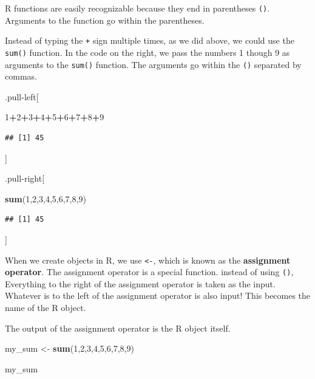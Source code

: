 \documentclass[
]{book}
\newenvironment{Shaded}{\begin{snugshade}}{\end{snugshade}}
\newcommand{\DecValTok}[1]{\textcolor[rgb]{0.00,0.00,0.81}{#1}}
\newcommand{\FunctionTok}[1]{\textcolor[rgb]{0.13,0.29,0.53}{\textbf{#1}}}
\newcommand{\NormalTok}[1]{#1}
\newcommand{\OtherTok}[1]{\textcolor[rgb]{0.56,0.35,0.01}{#1}}
\newcommand{\SpecialCharTok}[1]{\textcolor[rgb]{0.81,0.36,0.00}{\textbf{#1}}}
\begin{document}
R functions are easily recognizable because they end in parentheses \texttt{()}. Arguments to the function go within the parentheses.

Instead of typing the \texttt{+} sign multiple times, as we did above, we could use the \texttt{sum()} function. In the code on the right, we pass the numbers 1 though 9 as arguments to the \texttt{sum()} function. The arguments go within the \texttt{()} separated by commas.

.pull-left{[}

\begin{Shaded}
\begin{Highlighting}[]
\DecValTok{1}\SpecialCharTok{+}\DecValTok{2}\SpecialCharTok{+}\DecValTok{3}\SpecialCharTok{+}\DecValTok{4}\SpecialCharTok{+}\DecValTok{5}\SpecialCharTok{+}\DecValTok{6}\SpecialCharTok{+}\DecValTok{7}\SpecialCharTok{+}\DecValTok{8}\SpecialCharTok{+}\DecValTok{9}
\end{Highlighting}
\end{Shaded}

\begin{verbatim}
## [1] 45
\end{verbatim}

{]}

.pull-right{[}

\begin{Shaded}
\begin{Highlighting}[]
\FunctionTok{sum}\NormalTok{(}\DecValTok{1}\NormalTok{,}\DecValTok{2}\NormalTok{,}\DecValTok{3}\NormalTok{,}\DecValTok{4}\NormalTok{,}\DecValTok{5}\NormalTok{,}\DecValTok{6}\NormalTok{,}\DecValTok{7}\NormalTok{,}\DecValTok{8}\NormalTok{,}\DecValTok{9}\NormalTok{)}
\end{Highlighting}
\end{Shaded}

\begin{verbatim}
## [1] 45
\end{verbatim}

{]}

When we create objects in R, we use \texttt{\textless{}-}, which is known as the \textbf{assignment operator}. The assignment operator is a special function. instead of using \texttt{()}, Everything to the right of the assignment operator is taken as the input. Whatever is to the left of the assignment operator is also input! This becomes the name of the R object.

The output of the assignment operator is the R object itself.

\begin{Shaded}
\begin{Highlighting}[]
\NormalTok{my\_sum }\OtherTok{\textless{}{-}} \FunctionTok{sum}\NormalTok{(}\DecValTok{1}\NormalTok{,}\DecValTok{2}\NormalTok{,}\DecValTok{3}\NormalTok{,}\DecValTok{4}\NormalTok{,}\DecValTok{5}\NormalTok{,}\DecValTok{6}\NormalTok{,}\DecValTok{7}\NormalTok{,}\DecValTok{8}\NormalTok{,}\DecValTok{9}\NormalTok{)}

\NormalTok{my\_sum}
\end{Highlighting}
\end{Shaded}
\end{document}
